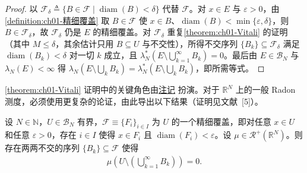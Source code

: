 \documentclass[../../main.tex]{subfiles}%
\begin{document}
\begin{proof}
以 $\mathcal{F}_\delta\triangleq\{B\in\mathcal{F}\mid\operatorname{diam}(B)<\delta\}$ 代替 $\mathcal{F}$。对 $x\in E$ 与 $\varepsilon>0$，由\cref{definition:ch01-精细覆盖} 取 $B\in\mathcal{F}$ 使 $x\in B$、$\operatorname{diam}(B)<\min\{\varepsilon,\delta\}$，则 $B\in\mathcal{F}_\delta$，故 $\mathcal{F}_\delta$ 仍是 $E$ 的精细覆盖。对 $\mathcal{F}_\delta$ 重复\cref{theorem:ch01-Vitali} 的证明（其中 $M\leqslant\delta$，其余估计只用 $B\subseteq U$ 与不交性），所得不交序列 $\{B_k\}\subseteq\mathcal{F}_\delta$ 满足 $\operatorname{diam}(B_k)<\delta$ 对一切 $k$ 成立，且 $\lambda_N^*(E\setminus\bigcup_{k=1}^\infty B_k)=0$。最后由 $E\in\mathcal{B}_N$ 与 $\lambda_N(E)<\infty$ 得 $\lambda_N(E\setminus\bigcup_kB_k)=\lambda_N^*(E\setminus\bigcup_kB_k)$，即所需等式。
\end{proof}

\cref{theorem:ch01-Vitali} 证明中的关键角色由\hyperref[remark:ch01-位似]{注记} 扮演。对于 $\mathbb{R}^N$ 上的一般 Radon 测度，必须使用更复杂的论证，由此导出以下结果（证明见文献~[5]）。

\begin{theorem}\label{theorem:ch01-VitaliBesicovitch}
设 $N\in\mathbb{N}$，$U\in\mathcal{B}_N$ 有界，$\mathcal{F}\equiv\{F_i\}_{i\in I}$ 为 $U$ 的一个精细覆盖，即对任意 $x\in U$ 和任意 $\varepsilon>0$，存在 $i\in I$ 使得 $x\in F_i$ 且 $\operatorname{diam}(F_i)<\varepsilon$。设 $\mu\in\mathcal{R}^+(\mathbb{R}^N)$。则存在两两不交的序列 $\{B_k\}\subseteq\mathcal{F}$ 使得
\begin{align*}
\mu\left(U\setminus\left(\bigcup_{k=1}^\infty B_k\right)\right)=0.
\end{align*}
\end{theorem}
\end{document}
